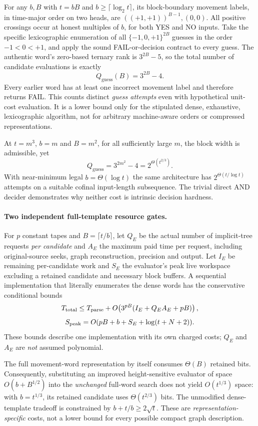 \documentclass[11pt]{article}
\begin{document}
For any $b,B$ with $t=bB$ and $b\ge\lceil\log_2t\rceil$,
its block-boundary movement labels, in time-major order on two heads,
are $((+1,+1))^{B-1},(0,0)$. All positive crossings occur
at honest multiples of $b$, for both YES and NO inputs.
Take the specific lexicographic enumeration of all
$\{-1,0,+1\}^{2B}$ guesses in the order $-1<0<+1$, and
apply the sound FAIL-or-decision contract to every guess.
The authentic word's zero-based ternary rank is
$3^{2B}-5$, so the total number of candidate evaluations is exactly
\[
\boxed{Q_{\mathrm{guess}}(B)=3^{2B}-4.}
\]
Every earlier word has at least one incorrect movement label
and therefore returns FAIL. This counts distinct \emph{guess attempts}
even with hypothetical unit-cost evaluation. It is a lower bound
only for the stipulated dense, exhaustive, lexicographic algorithm,
not for arbitrary machine-aware orders or compressed representations.

At $t=m^3$, $b=m$ and $B=m^2$, for all sufficiently large $m$,
the block width is admissible, yet
\[
Q_{\mathrm{guess}}=3^{2m^2}-4
=2^{\Theta(t^{2/3})}.
\]
With near-minimum legal $b=\Theta(\log t)$ the same architecture has
$2^{\Theta(t/\log t)}$ attempts on a suitable cofinal input-length
subsequence. The trivial direct AND decider demonstrates why neither
cost is intrinsic decision hardness.

\paragraph{Two independent full-template resource gates.}
For $p$ constant tapes and $B=\lceil t/b\rceil$, let $Q_E$ be the
actual number of implicit-tree requests \emph{per candidate} and $A_E$
the maximum paid time per request, including original-source seeks,
graph reconstruction, precision and output. Let $I_E$ be remaining
per-candidate work and $S_E$ the evaluator's peak live workspace
excluding a retained candidate and necessary block buffers.
A sequential implementation that literally enumerates the dense words
has the conservative conditional bounds
\[
T_{\rm total}\le T_{\rm parse}
+O\!\left(3^{pB}(I_E+Q_E A_E+pB)\right),
\]
\[
S_{\rm peak}=O(pB+b+S_E+\log(t+N+2)).
\]
These bounds describe one implementation with its own charged costs;
$Q_E$ and $A_E$ are \emph{not} assumed polynomial.

The full movement-word representation by itself consumes
$\Theta(B)$ retained bits. Consequently, substituting an improved
height-sensitive evaluator of space $O(b+B^{1/2})$ into the
\emph{unchanged} full-word search does not yield
$O(t^{1/3})$ space: with $b=t^{1/3}$, its retained candidate
uses $\Theta(t^{2/3})$ bits. The unmodified dense-template
tradeoff is constrained by $b+t/b\ge2\sqrt{t}$.
These are \emph{representation-specific} costs, not a lower bound for
every possible compact graph description.
\end{document}
